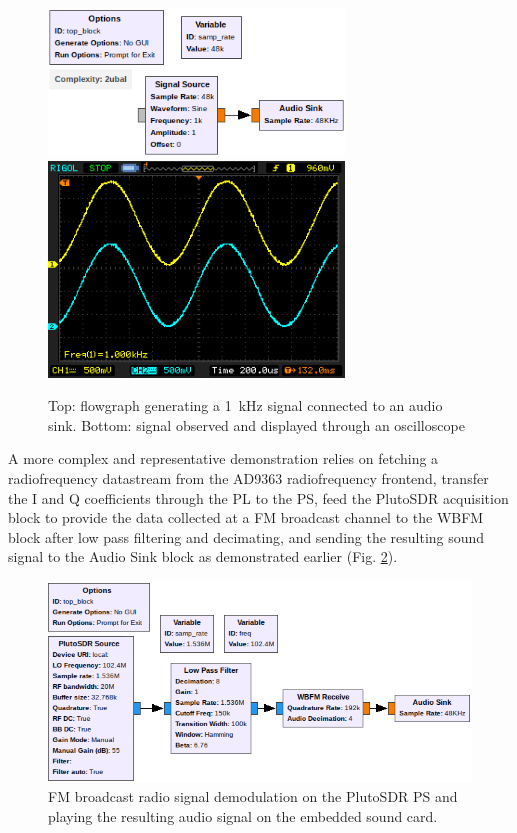 \documentclass[12pt,oneside]{article}
\begin{document}
\begin{figure}[h!tb]
\center\includegraphics[width=0.7\textwidth]{./figures/pluto_embedded_signal_to_audio}
\center\includegraphics[width=0.7\textwidth]{./figures/signal_to_audio}
\caption{Top: flowgraph generating a 1~kHz signal connected to an audio
sink. Bottom: signal observed and displayed through an oscilloscope}
\label{signal_to_audio}
\end{figure}

A more complex and representative demonstration relies on fetching a radiofrequency
datastream from the AD9363 radiofrequency frontend, transfer the I and Q coefficients
through the PL to the PS, feed the PlutoSDR acquisition block to provide the data
collected at a FM broadcast channel to the WBFM block after low pass filtering and decimating,
and sending the resulting sound signal to the Audio Sink block as demonstrated earlier (Fig. \ref{FM}).

\begin{figure}[h!tb]
\center\includegraphics[width=\textwidth]{./figures/pluto_embedded_audio}
\caption{FM broadcast radio signal demodulation on the PlutoSDR PS and playing the resulting
audio signal on the embedded sound card.}
\label{FM}
\end{figure}
\end{document}
